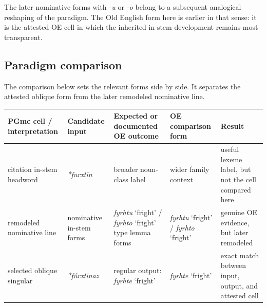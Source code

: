 \documentclass[
  british,
  a4paper,
  openany]{book}
\newcounter{none} %
\begin{document}
The later nominative forms with \emph{-u} or \emph{-o} belong to a
subsequent analogical reshaping of the paradigm. The Old English form
here is earlier in that sense: it is the attested OE cell in which the
inherited in-stem development remains most transparent.

\subsection{Paradigm comparison}\label{paradigm-comparison-5}

The comparison below sets the relevant forms side by side. It separates
the attested oblique form from the later remodeled nominative line.

{\def\LTcaptype{none} %
\begin{longtable}[]{@{}
  >{\raggedright\arraybackslash}p{}
  >{\raggedright\arraybackslash}p{}
  >{\raggedright\arraybackslash}p{}
  >{\raggedright\arraybackslash}p{}
  >{\raggedright\arraybackslash}p{}@{}}
\toprule\noalign{}
\begin{minipage}[b]{\linewidth}\raggedright
PGmc cell / interpretation
\end{minipage} & \begin{minipage}[b]{\linewidth}\raggedright
Candidate input
\end{minipage} & \begin{minipage}[b]{\linewidth}\raggedright
Expected or documented OE outcome
\end{minipage} & \begin{minipage}[b]{\linewidth}\raggedright
OE comparison form
\end{minipage} & \begin{minipage}[b]{\linewidth}\raggedright
Result
\end{minipage} \\
\midrule\noalign{}
\endhead
\bottomrule\noalign{}
\endlastfoot
citation in-stem headword & {\emph{*furxtīn}} & broader noun-class label
& wider family context & useful lexeme label, but not the cell compared
here \\
remodeled nominative line & nominative in-stem forms & {\emph{fyrhtu}}
`fright' / {\emph{fyrhto}} `fright' type lemma forms & {\emph{fyrhtu}}
`fright' / {\emph{fyrhto}} `fright' & genuine OE evidence, but later
remodeled \\
selected oblique singular & {\emph{*fúrxtīnaz}} & regular output:
{\emph{fyrhte}} `fright' & {\emph{fyrhte}} `fright' & exact match
between input, output, and attested cell \\
\end{longtable}
}
\end{document}
